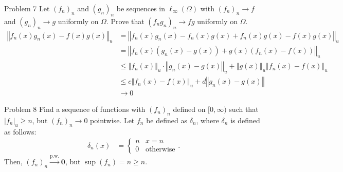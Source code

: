 \documentclass[8pt]{extarticle}
\renewcommand{\mathbf}[1]{\mathbold{#1}}
\begin{document}
  \begin{problem}{Problem 7}
    Let $(f_n)_n$ and $(g_n)_n$ be sequences in $\ell_{\infty}(\Omega)$ with $(f_n)_n \rightarrow f$ and $(g_n)_n \rightarrow g$ uniformly on $\Omega$. Prove that $(f_ng_n)_n \rightarrow fg$ uniformly on $\Omega$.
    \tcblower
    \begin{align*}
      \left\Vert f_n(x)g_n(x) - f(x)g(x)\right\Vert_u &= \left\Vert f_n(x)g_n(x) - f_n(x)g(x) + f_n(x)g(x) - f(x)g(x)\right\Vert_u\\
                                                      &= \left\Vert f_n(x)\left(g_n(x) - g(x)\right) + g(x)\left(f_n(x)-f(x)\right)\right\Vert_u\\
                                                      &\leq \left\Vert f_n(x)\right\Vert_u \cdot \left\Vert g_n(x) - g(x)\right\Vert_u + \left\Vert g(x)\right\Vert_u\left\Vert f_n(x) - f(x)\right\Vert_u \tag*{Triangle Inequality}\\
                                                      &\leq c\left\Vert f_n(x) - f(x)\right\Vert_u + d\left\Vert g_n(x) - g(x)\right\Vert \tag*{Definition of Supremum}\\
                                                      &\rightarrow 0
    \end{align*}
  \end{problem}
  \begin{problem}{Problem 8}
    Find a sequence of functions with $(f_n)_n$ defined on $[0,\infty)$ such that $\left|f_n\right|_u \geq n$, but $(f_n)_n \rightarrow 0$ pointwise.
    \tcblower
    Let $f_n$ be defined as $\delta_n$, where $\delta_n$ is defined as follows:
    \begin{align*}
      \delta_n(x) &= \begin{cases}
        n & x=n\\
        0 & \text{otherwise}
      \end{cases}.
    \end{align*}
    Then, $(f_n)_n \xrightarrow{\text{p.w.}} \mathbf{0}$, but $\sup(f_n) = n \geq n$.
  \end{problem}
\end{document}
